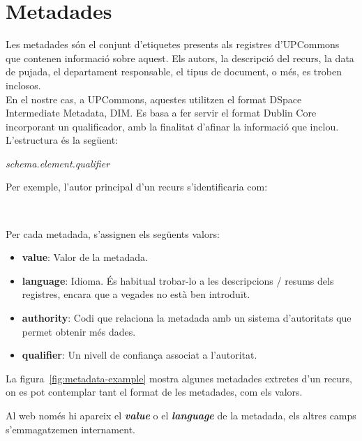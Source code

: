 \section{Metadades}\label{sec:metadata-processing}

Les metadades són el conjunt d'etiquetes presents als registres d'\gls{UPCommons} que contenen informació sobre aquest.
Els autors, la descripció del recurs, la data de pujada, el departament responsable, el tipus de document, o més, es troben inclosos. \\

\noindent
En el nostre cas, a \gls{UPCommons}, aquestes utilitzen el format \gls{DSpace} Intermediate Metadata, \gls{DIM}.
Es basa a fer servir el format Dublin Core incorporant un qualificador, amb la finalitat d'afinar la informació que inclou.
L'estructura és la següent:

\begin{center}
    \textit{schema.element.qualifier} \\
\end{center}

\noindent
Per exemple, l'autor principal d'un recurs s'identificaria com:

\begin{center}
     \\
\end{center}

\noindent
Per cada metadada, s'assignen els següents valors:

\begin{itemize}
    \item \textbf{value}: Valor de la metadada.
    \item \textbf{language}: Idioma.
    És habitual trobar-lo a les descripcions / resums dels registres, encara que a vegades no està ben introduït.
    \item \textbf{authority}: Codi que relaciona la metadada amb un sistema d'autoritats que permet obtenir més dades.
    \item \textbf{qualifier}: Un nivell de confiança associat a l'autoritat.
\end{itemize}

\clearpage

\noindent
La figura~\ref{fig:metadata-example} mostra algunes metadades extretes d'un recurs, on es pot contemplar tant el format de les metadades, com els valors. \\

\begin{tcolorbox}[colback=green!5!white, colframe=green!50!black, title=Metadades]
    Al web només hi apareix el \textbf{\textit{value}} o el \textbf{\textit{language}} de la metadada, els altres camps s'emmagatzemen internament.
\end{tcolorbox}

